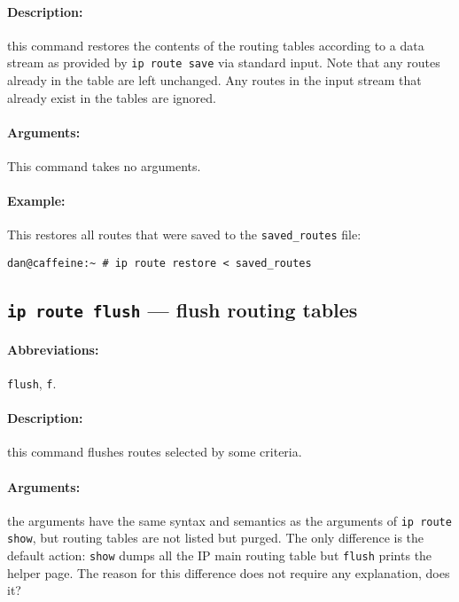 \paragraph{Description:} this command restores the contents of the routing
tables according to a data stream as provided by \verb|ip route save| via
standard input.  Note that any routes already in the table are left unchanged.
Any routes in the input stream that already exist in the tables are ignored.

\paragraph{Arguments:} This command takes no arguments.

\paragraph{Example:} This restores all routes that were saved to the
{\tt saved\_routes} file:

\begin{verbatim}
dan@caffeine:~ # ip route restore < saved_routes
\end{verbatim}

\subsection{{\tt ip route flush} --- flush routing tables}
\label{IP-ROUTE-FLUSH}

\paragraph{Abbreviations:} \verb|flush|, \verb|f|.

\paragraph{Description:} this command flushes routes selected
by some criteria.

\paragraph{Arguments:} the arguments have the same syntax and semantics
as the arguments of \verb|ip route show|, but routing tables are not
listed but purged. The only difference is the default action: \verb|show|
dumps all the IP main routing table but \verb|flush| prints the helper page.
The reason for this difference does not require any explanation, does it?


